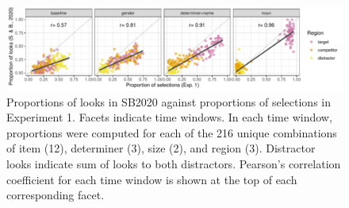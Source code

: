 \documentclass[10pt,letterpaper]{article}
\newcommand{\expref}[1]{Experiment #1}
\newcommand{\jd}[1]{\textcolor{Red}{\textbf{[jd: #1]}}}
\begin{document}
\begin{figure}[h!]
\centering
\includegraphics[width=.9\textwidth]{../../analysis/SunBreheny/1_incremental/main/graphs/corr-window}
\caption{Proportions of looks in SB2020 against proportions of selections in \expref{1}. Facets indicate time windows. In each time window, proportions were computed for each of the 216 unique combinations of item (12), determiner (3), size (2), and region (3). Distractor looks indicate sum of  looks to both distractors. Pearson's correlation coefficient for each time window is shown at the top of each corresponding facet.} 
\label{fig:corr-window}
\end{figure}

\end{document}
